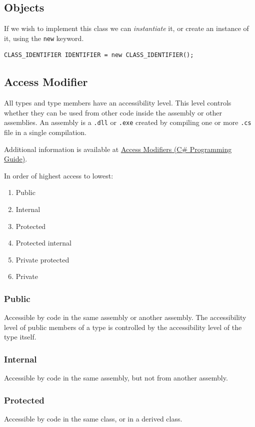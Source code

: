 \documentclass{article}
\begin{document}
\subsection{Objects}
If we wish to implement this class we can \textit{instantiate} it,
or create an instance of it, using the \lstinline{new} keyword.
\begin{lstlisting}[numbers=none]
CLASS_IDENTIFIER IDENTIFIER = new CLASS_IDENTIFIER();
\end{lstlisting}
\subsection{Access Modifier}
All types and type members have an accessibility level. This level controls whether they can
be used from other code inside the assembly or other assemblies. An assembly is a \lstinline{.dll}
or \lstinline{.exe} created by compiling one or more \lstinline{.cs} file in a single compilation.

Additional information is available at \href{https://docs.microsoft.com/en-us/dotnet/csharp/programming-guide/classes-and-structs/access-modifiers}{Access Modifiers (C\# Programming Guide)}.

In order of highest access to lowest:
\begin{enumerate}
    \item Public
    \item Internal 
    \item Protected
    \item Protected internal
    \item Private protected
    \item Private
\end{enumerate}
\subsubsection{Public}
Accessible by code in the same assembly or another assembly. 
The accessibility level of public members of a type is controlled by the accessibility level of the type itself.
\subsubsection{Internal}
Accessible by code in the same assembly, but not from another assembly.
\subsubsection{Protected}
Accessible by code in the same class, or in a derived class.
\end{document}
